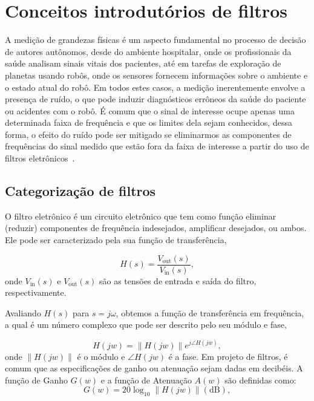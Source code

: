 
\chapter{Conceitos introdutórios de filtros}
\label{chap: introducao_filtros}

A medição de grandezas físicas é um aspecto fundamental no processo de decisão de autores autônomos, desde do ambiente hospitalar, onde os profissionais da saúde analisam sinais vitais dos pacientes, até em tarefas de exploração de planetas usando robôs, onde os sensores fornecem informações sobre o ambiente e o estado atual do robô. Em todos estes casos, a medição inerentemente envolve a presença de ruído, o que pode induzir diagnósticos errôneos da saúde do paciente ou acidentes com o robô. É comum que o sinal de interesse ocupe apenas uma determinada faixa de frequência e que os limites dela sejam conhecidos, dessa forma, o efeito do ruído pode ser mitigado se eliminarmos as componentes de frequências do sinal medido que estão fora da faixa de interesse a partir do uso de filtros eletrônicos~\cite{daryanani1976principles,sedra2011microeletronica}.

\section{Categorização de filtros}

O filtro eletrônico é um circuito eletrônico que tem como função eliminar (reduzir) componentes de frequência indesejados, amplificar desejados, ou ambos. Ele pode ser caracterizado pela sua função de transferência,

\begin{equation}
    H(s) = \frac{V_{\text{out}}(s)}{V_{\text{in}}(s)},
\end{equation}
onde $V_{\text{in}}(s)$ e $V_{\text{out}}(s)$ são as tensões de entrada e saída do filtro, respectivamente.  

Avaliando $H(s)$ para $s = j\omega$, obtemos a função de transferência em frequência, a qual é um número complexo que pode ser descrito pelo seu módulo e fase,

\begin{equation}
    H(jw) = \| H(jw) \| e^{j\angle H(jw)},
\end{equation}
onde $\| H(jw) \|$ é o módulo e $\angle H(jw)$ é a fase. Em projeto de filtros, é comum que as especificações de ganho ou atenuação sejam dadas em decibéis. A função de Ganho $G(w)$ e a função de Atenuação $A(w)$ são definidas como:
\begin{equation}
    G(w) = 20 \log_{10} \| H(jw) \| (\text{dB}),
\end{equation}

